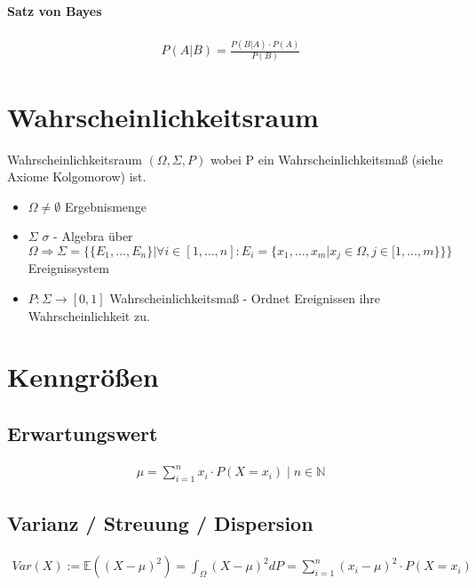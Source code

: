 \documentclass[12pt]{article}
\begin{document}
\paragraph{ Satz von Bayes}
\begin{align*}
	P( A \vert B ) = \frac{P(B \vert A) \cdot P(A)}{P(B)}
\end{align*}


\section{ Wahrscheinlichkeitsraum }

Wahrscheinlichkeitsraum \( ( \Omega, \Sigma, P) \) wobei P ein Wahrscheinlichkeitsmaß (siehe Axiome Kolgomorow) ist.

\begin{itemize}
	\item \( \Omega \neq \emptyset \) Ergebnismenge 
	\item \( \Sigma \) \( \sigma \) - Algebra über \( \Omega \Rightarrow \Sigma = \lbrace \lbrace E_1, \dots, E_n \rbrace \vert \forall i \in [1, \dots, n] : E_i = \lbrace x_1, \dots, x_m \vert x_j \in \Omega, j \in [1, \dots,m \rbrace \rbrace \rbrace \) Ereignissystem
	\item \( P:\Sigma \rightarrow [0, 1] \) Wahrscheinlichkeitsmaß - Ordnet Ereignissen ihre Wahrscheinlichkeit zu.
\end{itemize}

\section{ Kenngrößen }

\subsection*{Erwartungswert }

\begin{align*}
	\mu = \sum_{i=1}^{n} x_i \cdot  P(X=x_i) \mid n \in \mathbb{N}
\end{align*}
	 
\subsection*{Varianz / Streuung / Dispersion}

\begin{align*}
	Var(X) := \mathbb{E}((X-\mu)^2) = \int_{\Omega}^{} (X-\mu)^2 dP = \sum_{i=1}^{n} (x_i - \mu)^2 \cdot  P(X=x_i)
\end{align*}	 
	 
\end{document}
